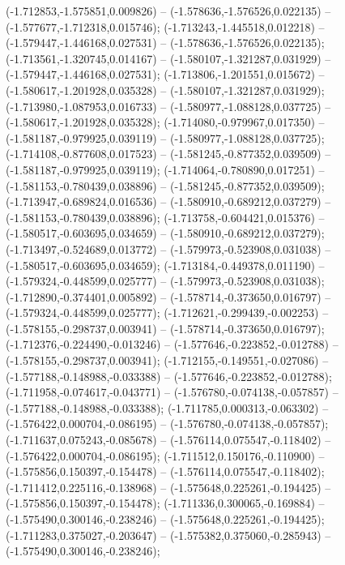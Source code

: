  (-1.712853,-1.575851,0.009826) -- (-1.578636,-1.576526,0.022135) -- (-1.577677,-1.712318,0.015746);
 (-1.713243,-1.445518,0.012218) -- (-1.579447,-1.446168,0.027531) -- (-1.578636,-1.576526,0.022135);
 (-1.713561,-1.320745,0.014167) -- (-1.580107,-1.321287,0.031929) -- (-1.579447,-1.446168,0.027531);
 (-1.713806,-1.201551,0.015672) -- (-1.580617,-1.201928,0.035328) -- (-1.580107,-1.321287,0.031929);
 (-1.713980,-1.087953,0.016733) -- (-1.580977,-1.088128,0.037725) -- (-1.580617,-1.201928,0.035328);
 (-1.714080,-0.979967,0.017350) -- (-1.581187,-0.979925,0.039119) -- (-1.580977,-1.088128,0.037725);
 (-1.714108,-0.877608,0.017523) -- (-1.581245,-0.877352,0.039509) -- (-1.581187,-0.979925,0.039119);
 (-1.714064,-0.780890,0.017251) -- (-1.581153,-0.780439,0.038896) -- (-1.581245,-0.877352,0.039509);
 (-1.713947,-0.689824,0.016536) -- (-1.580910,-0.689212,0.037279) -- (-1.581153,-0.780439,0.038896);
 (-1.713758,-0.604421,0.015376) -- (-1.580517,-0.603695,0.034659) -- (-1.580910,-0.689212,0.037279);
 (-1.713497,-0.524689,0.013772) -- (-1.579973,-0.523908,0.031038) -- (-1.580517,-0.603695,0.034659);
 (-1.713184,-0.449378,0.011190) -- (-1.579324,-0.448599,0.025777) -- (-1.579973,-0.523908,0.031038);
 (-1.712890,-0.374401,0.005892) -- (-1.578714,-0.373650,0.016797) -- (-1.579324,-0.448599,0.025777);
 (-1.712621,-0.299439,-0.002253) -- (-1.578155,-0.298737,0.003941) -- (-1.578714,-0.373650,0.016797);
 (-1.712376,-0.224490,-0.013246) -- (-1.577646,-0.223852,-0.012788) -- (-1.578155,-0.298737,0.003941);
 (-1.712155,-0.149551,-0.027086) -- (-1.577188,-0.148988,-0.033388) -- (-1.577646,-0.223852,-0.012788);
 (-1.711958,-0.074617,-0.043771) -- (-1.576780,-0.074138,-0.057857) -- (-1.577188,-0.148988,-0.033388);
 (-1.711785,0.000313,-0.063302) -- (-1.576422,0.000704,-0.086195) -- (-1.576780,-0.074138,-0.057857);
 (-1.711637,0.075243,-0.085678) -- (-1.576114,0.075547,-0.118402) -- (-1.576422,0.000704,-0.086195);
 (-1.711512,0.150176,-0.110900) -- (-1.575856,0.150397,-0.154478) -- (-1.576114,0.075547,-0.118402);
 (-1.711412,0.225116,-0.138968) -- (-1.575648,0.225261,-0.194425) -- (-1.575856,0.150397,-0.154478);
 (-1.711336,0.300065,-0.169884) -- (-1.575490,0.300146,-0.238246) -- (-1.575648,0.225261,-0.194425);
 (-1.711283,0.375027,-0.203647) -- (-1.575382,0.375060,-0.285943) -- (-1.575490,0.300146,-0.238246);
